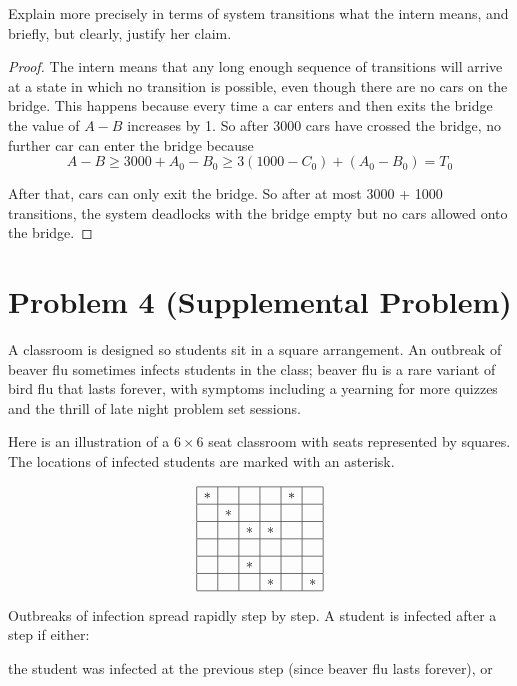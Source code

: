 \documentclass[14pt]{extarticle}
\begin{document}
Explain more precisely in terms of system transitions what the intern means, and briefly, but clearly, justify her claim.
\begin{proof}
The intern means that any long enough sequence of transitions will arrive at a state in which no transition is possible, even though there are no cars on the bridge. This happens because every time a car enters and then exits the bridge the value of $A - B$ increases by 1. So after 3000 cars have crossed the bridge, no further car can enter the bridge because 
$$
A - B \geq 3000 + A_0 - B_0 \geq 3(1000 - C_0) + (A_0 - B_0) = T_0
$$

After that, cars can only exit the bridge. So after at most 3000 + 1000 transitions, the system dead­locks with the bridge empty but no cars allowed onto the bridge.
\end{proof}

\section{Problem 4 (Supplemental Problem)}
A classroom is designed so students sit in a square arrangement. An outbreak of beaver flu sometimes infects students in the class; beaver flu is a rare variant of bird flu that lasts forever, with symptoms including a yearning for more quizzes and the thrill of late night problem set sessions.

Here is an illustration of a $6 \times 6$ seat classroom with seats represented by squares. The locations of infected students are marked with an asterisk.

$$
\begin{array}{|c|c|c|c|c|c|}
\hline
 * & \,\,\, & \,\,\,  & \,\,\,  & * & \,\,\, \\
\hline
 \,\,\, & * & \,\,\,  & \,\,\,  & \,\,\, & \,\,\, \\
\hline
 \,\,\, & \,\,\, & *  & *  & \,\,\, & \,\,\, \\
\hline
 \,\,\, & \,\,\, & \,\,\,  & \,\,\,  & \,\,\, & \,\,\, \\
\hline
 \,\,\, & \,\,\, & *  & \,\,\,  & \,\,\, & \,\,\, \\
\hline
 \,\,\, & \,\,\, & \,\,\,  & *  & \,\,\, & * \\
\hline
\end{array}
$$

Outbreaks of infection spread rapidly step by step. A student is infected after a step if either:

the student was infected at the previous step (since beaver flu lasts forever), or
\end{document}
